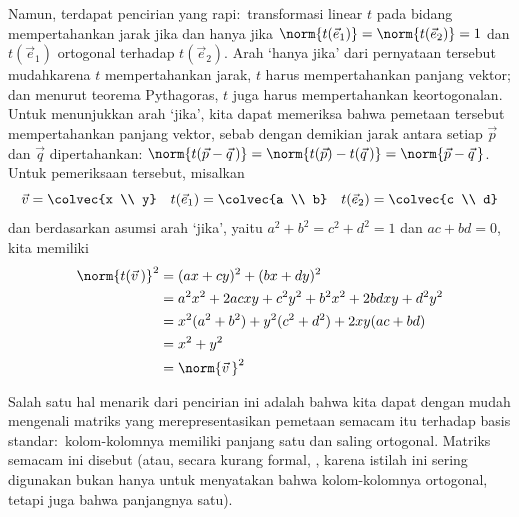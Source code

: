 Namun, terdapat pencirian yang rapi:~transformasi linear $t$ pada bidang
mempertahankan jarak jika dan hanya jika
$\norm{t(\vec{e}_1)}=\norm{t(\vec{e}_2)}=1$ dan $t(\vec{e}_1)$ ortogonal
terhadap $t(\vec{e}_2)$.
Arah `hanya jika' dari pernyataan tersebut mudah\Dash karena $t$
mempertahankan jarak, $t$ harus mempertahankan panjang vektor; dan menurut
teorema Pythagoras, $t$ juga harus mempertahankan keortogonalan.
Untuk menunjukkan arah `jika', kita dapat memeriksa bahwa pemetaan tersebut
mempertahankan panjang vektor, sebab dengan demikian jarak antara setiap
$\vec{p}$ dan $\vec{q}$ dipertahankan:
$\norm{t(\vec{p}-\vec{q}\,)}=\norm{t(\vec{p})-t(\vec{q}\,)}
=\norm{\vec{p}-\vec{q}\,}$.
Untuk pemeriksaan tersebut, misalkan
\begin{equation*}
  \vec{v}=\colvec{x \\ y} 
  \quad 
  t(\vec{e}_1)=\colvec{a \\ b}
  \quad
  t(\vec{e}_2)=\colvec{c \\ d}
\end{equation*}
dan berdasarkan asumsi arah `jika', yaitu
$a^2+b^2=c^2+d^2=1$ dan $ac+bd=0$, kita memiliki
\begin{align*}
  \norm{t(\vec{v}\,)}^2
  &= (ax+cy)^2+(bx+dy)^2  \\
  &= a^2x^2+2acxy+c^2y^2+b^2x^2+2bdxy+d^2y^2 \\
  &= x^2(a^2+b^2)+y^2(c^2+d^2)+2xy(ac+bd)  \\
  &= x^2 + y^2 \\
  &= \norm{\vec{v}\,}^2
\end{align*}

Salah satu hal menarik dari pencirian ini adalah bahwa kita dapat dengan mudah
mengenali matriks yang merepresentasikan pemetaan semacam itu terhadap basis
standar:~kolom-kolomnya memiliki panjang satu dan saling ortogonal.
Matriks semacam ini disebut 
 (atau, secara kurang
formal, %
, karena istilah ini sering digunakan bukan hanya
untuk menyatakan bahwa kolom-kolomnya ortogonal, tetapi juga bahwa panjangnya
satu).

